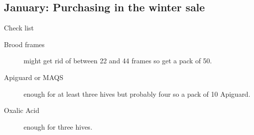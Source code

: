 \subsection{January: Purchasing in the winter sale}

Check list

\begin{description}

  \item[Brood frames] might get rid of between 22 and 44 frames so get a pack of 50.
  \item[Apiguard or MAQS] enough for at least three hives but probably four so a pack of 10 Apiguard.
  \item[Oxalic Acid] enough for three hives.

\end{description}

